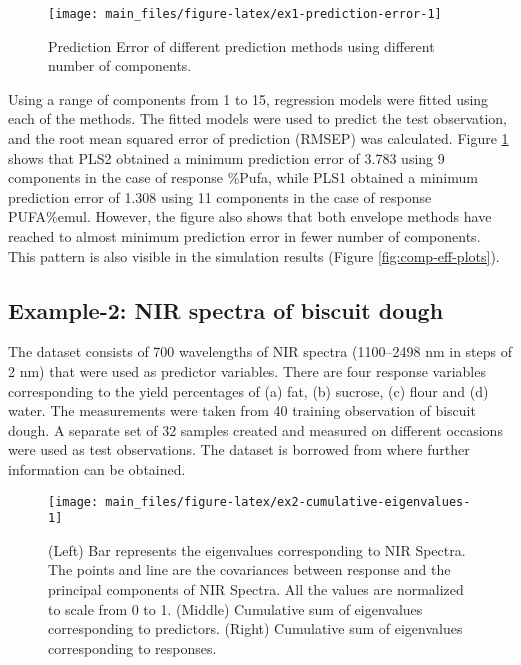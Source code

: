 \documentclass[review]{elsarticle}
\begin{document}
\begin{figure}[!htb]
\texttt{[image: main\_files/figure-latex/ex1-prediction-error-1]} \caption{Prediction Error of different prediction methods using different number of components.}\label{fig:ex1-prediction-error}
\end{figure}

Using a range of components from 1 to 15, regression models were fitted using each of the methods. The fitted models were used to predict the test observation, and the root mean squared error of prediction (RMSEP) was calculated. Figure \ref{fig:ex1-prediction-error} shows that PLS2 obtained a minimum prediction error of 3.783 using 9 components in the case of response \%Pufa, while PLS1 obtained a minimum prediction error of 1.308 using 11 components in the case of response PUFA\%emul. However, the figure also shows that both envelope methods have reached to almost minimum prediction error in fewer number of components. This pattern is also visible in the simulation results (Figure \ref{fig:comp-eff-plots}).

\hypertarget{example-2-nir-spectra-of-biscuit-dough}{%
\subsection{Example-2: NIR spectra of biscuit dough}\label{example-2-nir-spectra-of-biscuit-dough}}

The dataset consists of 700 wavelengths of NIR spectra (1100--2498 nm in steps of 2 nm) that were used as predictor variables. There are four response variables corresponding to the yield percentages of (a) fat, (b) sucrose, (c) flour and (d) water. The measurements were taken from 40 training observation of biscuit dough. A separate set of 32 samples created and measured on different occasions were used as test observations. The dataset is borrowed from \citet{indahl2005twist} where further information can be obtained.



\begin{figure}
\texttt{[image: main\_files/figure-latex/ex2-cumulative-eigenvalues-1]} \caption{(Left) Bar represents the eigenvalues corresponding to NIR Spectra. The points and line are the covariances between response and the principal components of NIR Spectra. All the values are normalized to scale from 0 to 1. (Middle) Cumulative sum of eigenvalues corresponding to predictors. (Right) Cumulative sum of eigenvalues corresponding to responses.}\label{fig:ex2-cumulative-eigenvalues}
\end{figure}
\end{document}
